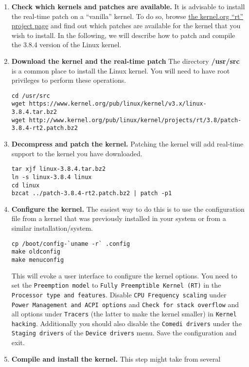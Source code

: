 \begin{enumerate}
\item \textbf{Check which kernels and patches are available.}
  It is advisable to install the real-time patch on a ``vanilla''
  kernel. To do so, browse
  \href{https://www.kernel.org/pub/linux/kernel/projects/rt/}{the
      kernel.org ``rt'' project page} and find out which patches are
  available for the kernel that you wish to install. In the following, we will
  describe how to patch and compile the 3.8.4 version of the Linux kernel.
\item \textbf{Download the kernel and the real-time patch} The
  directory \textbf{/usr/src} is a common place to install the Linux
  kernel. You will need to have root privileges to perform these
  operations.
  \begin{lstlisting}
cd /usr/src
wget https://www.kernel.org/pub/linux/kernel/v3.x/linux-3.8.4.tar.bz2
wget http://www.kernel.org/pub/linux/kernel/projects/rt/3.8/patch-3.8.4-rt2.patch.bz2
  \end{lstlisting}
\item \textbf{Decompress and patch the kernel.} Patching the kernel
  will add real-time support to the kernel you have downloaded.
  \begin{lstlisting}
tar xjf linux-3.8.4.tar.bz2
ln -s linux-3.8.4 linux
cd linux
bzcat ../patch-3.8.4-rt2.patch.bz2 | patch -p1
  \end{lstlisting}
\item \textbf{Configure the kernel.} The easiest way to do this is to
  use the configuration file from a kernel that was previously
  installed in your system or from a similar installation/system.
  \begin{lstlisting}
cp /boot/config-`uname -r` .config
make oldconfig
make menuconfig
  \end{lstlisting}
  This will evoke a user interface to configure the kernel options.
You need to set the \texttt{Preemption model} to \texttt{Fully
  Preemptible Kernel (RT)} in the \texttt{Processor type and
  features}. Disable \texttt{CPU Frequency scaling} under
\texttt{Power Management and ACPI options} and \texttt{Check for
  stack overflow} and all options under \texttt{Tracers} (the latter to
make the kernel smaller) in \texttt{Kernel hacking}. Additionally you
should also disable the \texttt{Comedi drivers} under the
\texttt{Staging drivers} of the \texttt{Device drivers} menu. Save the configuration
and exit.
\item \textbf{Compile and install the kernel.} This step might take from several

\end{enumerate}
